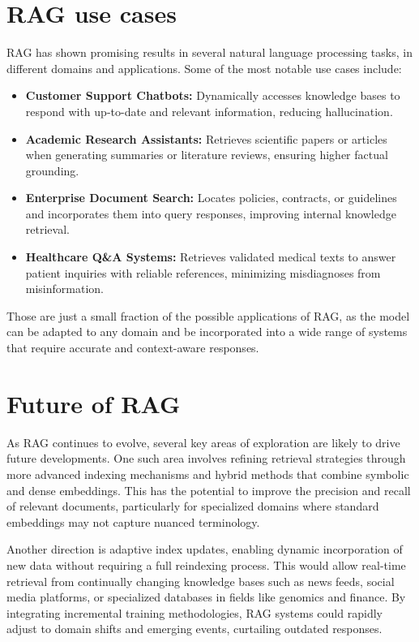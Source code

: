 \documentclass[conference]{IEEEtran}
\begin{document}
\section{RAG use cases}
RAG has shown promising results in several natural language processing tasks, in different
domains and applications. Some of the most notable use cases include:
\begin{itemize}
    \item \textbf{Customer Support Chatbots:} Dynamically accesses knowledge bases to respond with up-to-date and relevant information, reducing hallucination.
    \item \textbf{Academic Research Assistants:} Retrieves scientific papers or articles when generating summaries or literature reviews, ensuring higher factual grounding.
    \item \textbf{Enterprise Document Search:} Locates policies, contracts, or guidelines and incorporates them into query responses, improving internal knowledge retrieval.
    \item \textbf{Healthcare Q\&A Systems:} Retrieves validated medical texts to answer patient inquiries with reliable references, minimizing misdiagnoses from misinformation.
\end{itemize}
Those are just a small fraction of the possible applications of RAG, as the model can be adapted to any domain and be
incorporated into a wide range of systems that require accurate and context-aware responses.

\section{Future of RAG}
As RAG continues to evolve, several key areas of exploration are likely to drive future developments. One such area involves refining retrieval strategies through more advanced indexing mechanisms and hybrid methods that combine symbolic and dense embeddings. This has the potential to improve the precision and recall of relevant documents, particularly for specialized domains where standard embeddings may not capture nuanced terminology.

Another direction is adaptive index updates, enabling dynamic incorporation of new data without requiring a full reindexing process. This would allow real-time retrieval from continually changing knowledge bases such as news feeds, social media platforms, or specialized databases in fields like genomics and finance. By integrating incremental training methodologies, RAG systems could rapidly adjust to domain shifts and emerging events, curtailing outdated responses.
\end{document}
